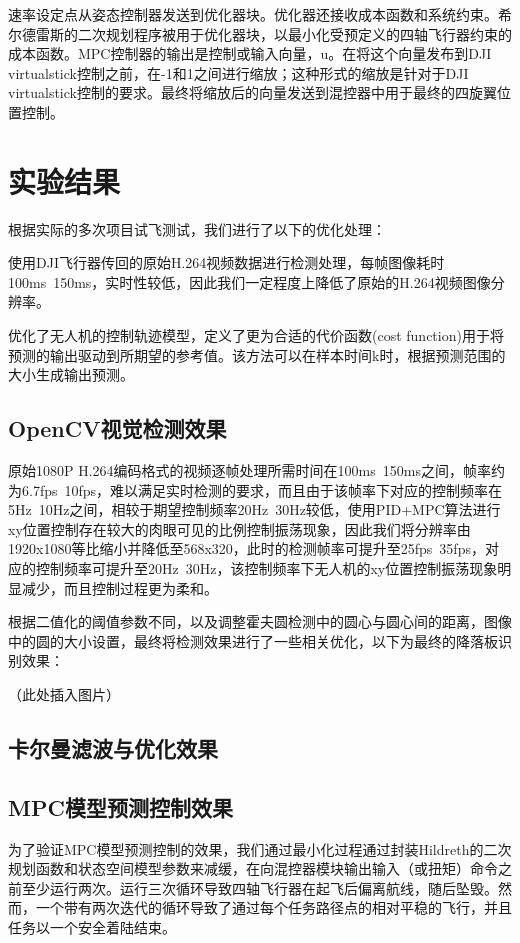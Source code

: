 速率设定点从姿态控制器发送到优化器块。优化器还接收成本函数和系统约束。希尔德雷斯的二次规划程序被用于优化器块，以最小化受预定义的四轴飞行器约束的成本函数。MPC控制器的输出是控制或输入向量，u。在将这个向量发布到DJI virtualstick控制之前，在-1和1之间进行缩放；这种形式的缩放是针对于DJI virtualstick控制的要求。最终将缩放后的向量发送到混控器中用于最终的四旋翼位置控制。

\chapter{实验结果}

根据实际的多次项目试飞测试，我们进行了以下的优化处理：

使用DJI飞行器传回的原始H.264视频数据进行检测处理，每帧图像耗时100ms~150ms，实时性较低，因此我们一定程度上降低了原始的H.264视频图像分辨率。

优化了无人机的控制轨迹模型，定义了更为合适的代价函数(cost function)用于将预测的输出驱动到所期望的参考值。该方法可以在样本时间k时，根据预测范围的大小生成输出预测。

\section{OpenCV视觉检测效果}

原始1080P H.264编码格式的视频逐帧处理所需时间在100ms~150ms之间，帧率约为6.7fps~10fps，难以满足实时检测的要求，而且由于该帧率下对应的控制频率在5Hz~10Hz之间，相较于期望控制频率20Hz~30Hz较低，使用PID+MPC算法进行xy位置控制存在较大的肉眼可见的比例控制振荡现象，因此我们将分辨率由1920x1080等比缩小并降低至568x320，此时的检测帧率可提升至25fps~35fps，对应的控制频率可提升至20Hz~30Hz，该控制频率下无人机的xy位置控制振荡现象明显减少，而且控制过程更为柔和。

根据二值化的阈值参数不同，以及调整霍夫圆检测中的圆心与圆心间的距离，图像中的圆的大小设置，最终将检测效果进行了一些相关优化，以下为最终的降落板识别效果：

（此处插入图片）

\section{卡尔曼滤波与优化效果}

\section{MPC模型预测控制效果}

为了验证MPC模型预测控制的效果，我们通过最小化过程通过封装Hildreth的二次规划函数和状态空间模型参数来减缓，在向混控器模块输出输入（或扭矩）命令之前至少运行两次。运行三次循环导致四轴飞行器在起飞后偏离航线，随后坠毁。然而，一个带有两次迭代的循环导致了通过每个任务路径点的相对平稳的飞行，并且任务以一个安全着陆结束。

